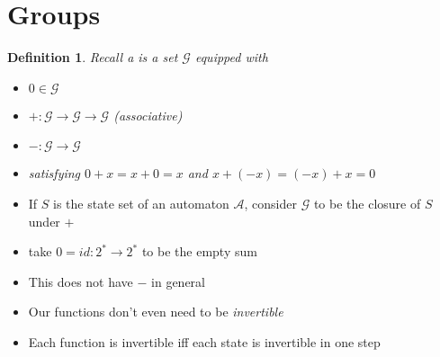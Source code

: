 \documentclass{beamer}
\newtheorem{defn}{Definition}
\newcommand{\2}{\textbf{2}}
\newcommand{\A}{\mathcal{A}}
\newcommand{\G}{\mathcal{G}}
\begin{document}
\section{Groups}
\begin{frame}
  \begin{defn}
    Recall a  is a set $\G$ equipped with
    \begin{itemize}
      \item $0 \in \G$
      \item $+ : \G \to \G \to \G$ (associative)
      \item $- : \G \to \G$
      \item satisfying $0+x = x+0 = x$ and $x + (-x) = (-x) + x = 0$
    \end{itemize}
  \end{defn}
  
  \pause

  \begin{itemize}
    \item If $S$ is the state set of an automaton $\A$, consider 
      $\G$ to be the closure of $S$ under $+$ 
    \item take $0=id : 2^* \to 2^*$ to be the empty sum
    \pause
    \item This does not have $-$ in general
    \item Our functions don't even need to be \emph{invertible}
    \pause
    \item Each function is invertible iff each state is invertible in one step
  \end{itemize}
\end{frame}
\end{document}
